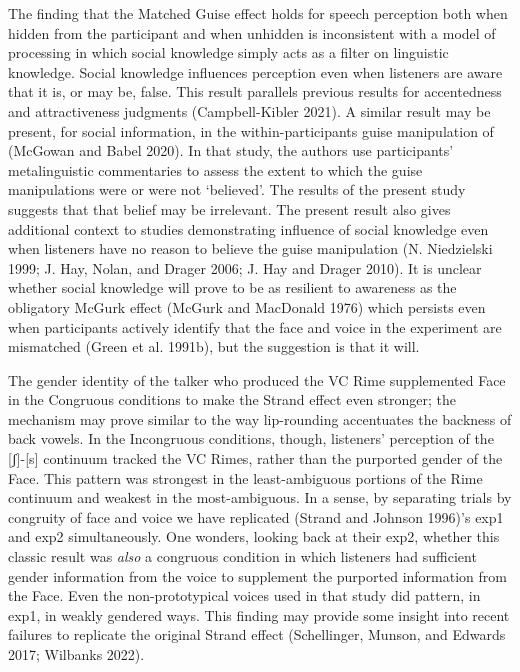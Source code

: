 \documentclass[
  letterpaper,
  DIV=11,
  numbers=noendperiod]{scrartcl}
\begin{document}
The finding that the Matched Guise effect holds for speech perception
both when hidden from the participant and when unhidden is inconsistent
with a model of processing in which social knowledge simply acts as a
filter on linguistic knowledge. Social knowledge influences perception
even when listeners are aware that it is, or may be, false. This result
parallels previous results for accentedness and attractiveness judgments
(Campbell-Kibler 2021). A similar result may be present, for social
information, in the within-participants guise manipulation of (McGowan
and Babel 2020). In that study, the authors use participants'
metalinguistic commentaries to assess the extent to which the guise
manipulations were or were not `believed'. The results of the present
study suggests that that belief may be irrelevant. The present result
also gives additional context to studies demonstrating influence of
social knowledge even when listeners have no reason to believe the guise
manipulation (N. Niedzielski 1999; J. Hay, Nolan, and Drager 2006; J.
Hay and Drager 2010). It is unclear whether social knowledge will prove
to be as resilient to awareness as the obligatory McGurk effect (McGurk
and MacDonald 1976) which persists even when participants actively
identify that the face and voice in the experiment are mismatched (Green
et al. 1991b), but the suggestion is that it will.

The gender identity of the talker who produced the VC Rime supplemented
Face in the Congruous conditions to make the Strand effect even
stronger; the mechanism may prove similar to the way lip-rounding
accentuates the backness of back vowels. In the Incongruous conditions,
though, listeners' perception of the {[}ʃ{]}-{[}s{]} continuum tracked
the VC Rimes, rather than the purported gender of the Face. This pattern
was strongest in the least-ambiguous portions of the Rime continuum and
weakest in the most-ambiguous. In a sense, by separating trials by
congruity of face and voice we have replicated (Strand and Johnson
1996)'s exp1 and exp2 simultaneously. One wonders, looking back at their
exp2, whether this classic result was \emph{also} a congruous condition
in which listeners had sufficient gender information from the voice to
supplement the purported information from the Face. Even the
non-prototypical voices used in that study did pattern, in exp1, in
weakly gendered ways. This finding may provide some insight into recent
failures to replicate the original Strand effect (Schellinger, Munson,
and Edwards 2017; Wilbanks 2022).
\end{document}
